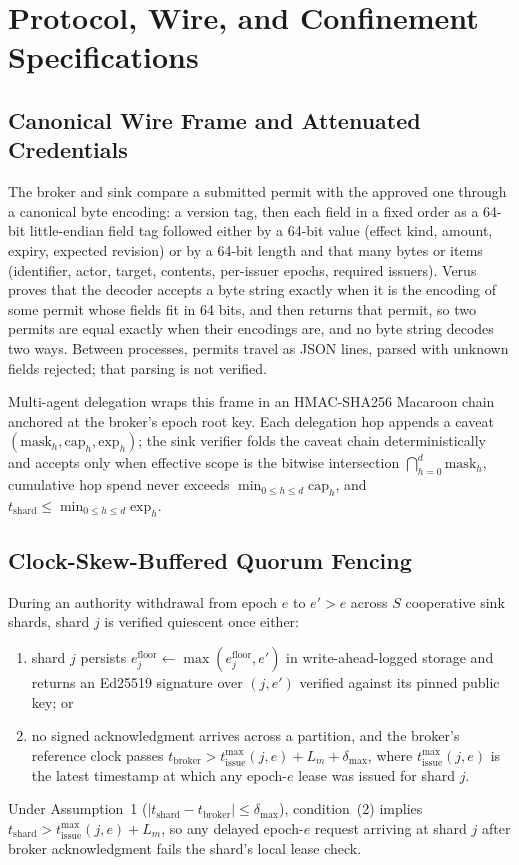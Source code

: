 \section{Protocol, Wire, and Confinement Specifications}\label{app:specs}

\subsection{Canonical Wire Frame and Attenuated Credentials}

The broker and sink compare a submitted permit with the approved one through a canonical byte encoding: a version tag, then each field in a fixed order as a 64-bit little-endian field tag followed either by a 64-bit value (effect kind, amount, expiry, expected revision) or by a 64-bit length and that many bytes or items (identifier, actor, target, contents, per-issuer epochs, required issuers). Verus proves that the decoder accepts a byte string exactly when it is the encoding of some permit whose fields fit in 64 bits, and then returns that permit, so two permits are equal exactly when their encodings are, and no byte string decodes two ways. Between processes, permits travel as JSON lines, parsed with unknown fields rejected; that parsing is not verified.

Multi-agent delegation wraps this frame in an HMAC-SHA256 Macaroon chain~\cite{birgisson2014} anchored at the broker's epoch root key. Each delegation hop appends a caveat \((\mathrm{mask}_h, \mathrm{cap}_h, \mathrm{exp}_h)\); the sink verifier folds the caveat chain deterministically and accepts only when effective scope is the bitwise intersection \(\bigcap_{h=0}^d \mathrm{mask}_h\), cumulative hop spend never exceeds \(\min_{0 \le h \le d} \mathrm{cap}_h\), and \(t_{\mathrm{shard}} \le \min_{0 \le h \le d} \mathrm{exp}_h\).

\subsection{Clock-Skew-Buffered Quorum Fencing}

During an authority withdrawal from epoch \(e\) to \(e' > e\) across \(S\) cooperative sink shards, shard \(j\) is verified quiescent once either:
\begin{enumerate}
  \item shard \(j\) persists \(e^{\mathrm{floor}}_j \leftarrow \max(e^{\mathrm{floor}}_j, e')\) in write-ahead-logged storage and returns an Ed25519 signature over \((j, e')\) verified against its pinned public key; or
  \item no signed acknowledgment arrives across a partition, and the broker's reference clock passes \(t_{\mathrm{broker}} > t_{\mathrm{issue}}^{\max}(j, e) + L_m + \delta_{\max}\), where \(t_{\mathrm{issue}}^{\max}(j, e)\) is the latest timestamp at which any epoch-\(e\) lease was issued for shard \(j\).
\end{enumerate}
Under Assumption~1 (\(|t_{\mathrm{shard}} - t_{\mathrm{broker}}| \le \delta_{\max}\)), condition~(2) implies \(t_{\mathrm{shard}} > t_{\mathrm{issue}}^{\max}(j, e) + L_m\), so any delayed epoch-\(e\) request arriving at shard \(j\) after broker acknowledgment fails the shard's local lease check.

